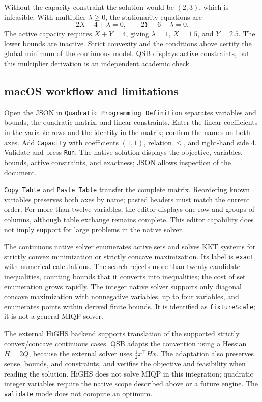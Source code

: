 Without the capacity constraint the solution would be \((2,3)\), which is
infeasible. With multiplier \(\lambda\geq0\), the stationarity equations are
\[
 2X-4+\lambda=0,\qquad2Y-6+\lambda=0.
\]
The active capacity requires \(X+Y=4\), giving \(\lambda=1\), \(X=1.5\), and
\(Y=2.5\). The lower bounds are inactive. Strict convexity and the conditions
above certify the global minimum of the continuous model.
QSB displays active constraints, but this multiplier derivation is an
independent academic check.

\subsection{macOS workflow and limitations}
Open the JSON in \texttt{Quadratic Programming}. \texttt{Definition} separates
variables and bounds, the quadratic matrix, and linear constraints. Enter
the linear coefficients in the variable rows and the identity in the matrix;
confirm the names on both axes. Add \texttt{Capacity} with coefficients
\((1,1)\), relation \(\leq\), and right-hand side 4. Validate and press
\texttt{Run}. The native solution displays the objective, variables, bounds,
active constraints, and exactness; JSON allows inspection of the document.

\texttt{Copy Table} and \texttt{Paste Table} transfer the complete matrix.
Reordering known variables preserves both axes by name; pasted headers must
match the current order. For more than twelve variables, the editor displays
one row and groups of columns, although table exchange remains complete.
This editor capability does not imply support for large problems in the
native solver.

The continuous native solver enumerates active sets and solves KKT systems
for strictly convex minimization or strictly concave maximization. Its label
is \texttt{exact}, with numerical calculations. The search rejects more than
twenty candidate inequalities, counting bounds that it converts into
inequalities; the cost of set enumeration grows rapidly. The integer native
solver supports only diagonal concave maximization with nonnegative variables,
up to four variables, and enumerates points within derived finite bounds.
It is identified as \texttt{fixtureScale}; it is not a general MIQP solver.

The external HiGHS backend supports translation of the supported strictly
convex/concave continuous cases. QSB adapts the convention using a Hessian
\(H=2Q\), because the external solver uses \(\tfrac12 x^\top Hx\).
The adaptation also preserves sense, bounds, and constraints, and verifies
the objective and feasibility when reading the solution.
HiGHS does not solve MIQP in this integration; quadratic integer variables
require the native scope described above or a future engine. The
\texttt{validate} mode does not compute an optimum.

